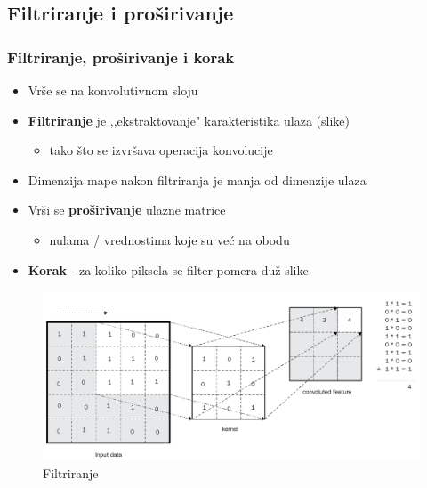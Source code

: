 \documentclass{beamer}
\begin{document}
\subsection{Filtriranje i proširivanje}
\begin{frame}
\frametitle{Filtriranje, proširivanje i korak}

\begin{itemize}
\item Vrše se na konvolutivnom sloju
\item \textbf{Filtriranje} je ,,ekstraktovanje" karakteristika ulaza (slike)
\begin{itemize}
\item tako što se izvršava operacija konvolucije
\end{itemize}
\item Dimenzija mape nakon filtriranja je manja od dimenzije ulaza
\item Vrši se \textbf{proširivanje} ulazne matrice
\begin{itemize}
\item nulama / vrednostima koje su već na obodu
\end{itemize}
\item \textbf{Korak} - za koliko piksela se filter pomera duž slike
\end{itemize}

\begin{figure}
\includegraphics[scale=0.5]{filtriranje_mape.png}
\caption{Filtriranje}
\end{figure}



\end{frame}
\end{document}
